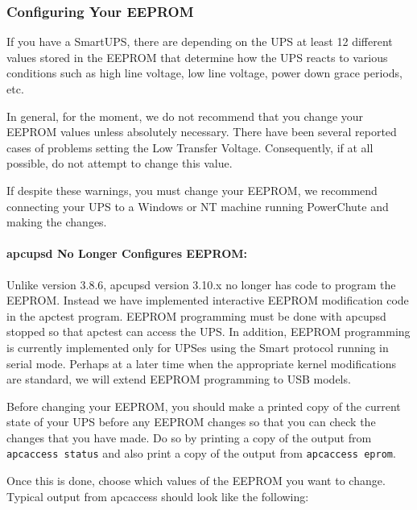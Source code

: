 {{{{{{{{{\subsubsection*{Configuring Your EEPROM}

\label{index-eeprom_002c-configuring-140}
\label{index-Configuring_002c-eeprom-141}
If you have a SmartUPS, there are depending on the UPS at least 12 different
values stored in the EEPROM that determine how the UPS reacts to various
conditions such as high line voltage, low line voltage, power down grace
periods, etc.  

In general, for the moment, we do not recommend that you change your EEPROM
values unless absolutely necessary. There have been several reported cases of
problems setting the Low Transfer Voltage. Consequently, if at all possible,
do not attempt to change this value.  

If despite these warnings, you must change your EEPROM, we recommend
connecting your UPS to a Windows or NT machine running PowerChute and making
the changes. 

\label{apcupsd-No-Longer-Configures-EEPROM}

\paragraph*{apcupsd No Longer Configures EEPROM:}

Unlike version 3.8.6, apcupsd version 3.10.x no longer has code to program the
EEPROM. Instead we have implemented interactive EEPROM modification code in
the apctest program. EEPROM programming must be done with apcupsd stopped so
that apctest can access the UPS. In addition, EEPROM programming is currently
implemented only for UPSes using the Smart protocol running in serial mode.
Perhaps at a later time when the appropriate kernel modifications are
standard, we will extend EEPROM programming to USB models.  

Before changing your EEPROM, you should make a printed copy of the current
state of your UPS before any EEPROM changes so that you can check the changes
that you have made. Do so by printing a copy of the output from {\tt apcaccess
status} and also print a copy of the output from {\tt apcaccess eprom}.  

Once this is done, choose which values of the EEPROM you want to change.
Typical output from apcaccess should look like the following: 

}}}}}}}}}
